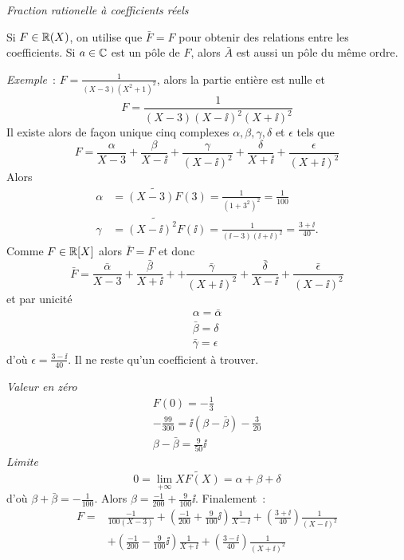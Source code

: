 \emph{Fraction rationelle à coefficients réels}

Si $F \in \mathbb{R}(X)$, on utilise que $\bar{F}=F$ pour obtenir des relations entre les coefficients. Si $a \in \mathbb{C}$ est un pôle de $F$, alors $\bar{A}$ est aussi un pôle du même ordre.

\emph{Exemple}~: $F=\frac{1}{(X-3)(X^2+1)^2}$, alors la partie entière est nulle et
\begin{equation}
  F = \frac{1}{(X-3)(X-\ii)^2(X+\ii)^2}
\end{equation}
Il existe alors de façon unique cinq complexes $\alpha,\beta,\gamma,\delta$ et $\epsilon$ tels que
\begin{equation}
  F = \frac{\alpha}{X-3} + \frac{\beta}{X-\ii} +\frac{\gamma}{(X-\ii)^2} +\frac{\delta}{X+\ii} +\frac{\epsilon}{(X+\ii)^2}
\end{equation}
Alors
\begin{align}
  \alpha &= \widetilde{(X-3)F}(3)=\frac{1}{(1+3^2)^2}=\frac{1}{100} \\
  \gamma &= \widetilde{(X-\ii)^2F}(\ii) = \frac{1}{(\ii-3)(\ii+\ii)^2}=\frac{3+\ii}{40}.
\end{align}
Comme $F \in \mathbb{R}[X]$ alors $\bar{F}=F$ et donc
\begin{equation}
  \bar{F} = \frac{\bar{\alpha}}{X-3} + \frac{\bar{\beta}}{X+\ii} + +\frac{\bar{\gamma}}{(X+\ii)^2} +\frac{\bar{\delta}}{X-\ii} +\frac{\bar{\epsilon}}{(X-\ii)^2}
\end{equation}
et par unicité
\begin{align}
  \alpha=\bar{\alpha}\\
  \bar{\beta}=\delta\\
  \bar{\gamma}=\epsilon
\end{align}
d'où $\epsilon = \frac{3-\ii}{40}$. Il ne reste qu'un coefficient à trouver.

\emph{Valeur en zéro}
\begin{align}
  F(0)=-\frac{1}{3}\\
  -\frac{99}{300} = \ii(\beta-\bar{\beta})-\frac{3}{20}\\
  \beta-\bar{\beta}=\frac{9}{50}\ii
\end{align}
\emph{Limite}
\begin{equation}
  0 = \lim\limits_{+\infty}\widetilde{XF(X)}=\alpha+\beta+\delta
\end{equation}
d'où $\beta+\bar{\beta}=-\frac{1}{100}$. Alors $\beta = \frac{-1}{200}+\frac{9}{100}\ii$. Finalement~:
\begin{align}
  F = &\frac{-1}{100(X-3)} + \left(\frac{-1}{200}+\frac{9}{100}\ii\right) \frac{1}{X-\ii} + \left(\frac{3+\ii}{40}\right)\frac{1}{(X-\ii)^2} \\ & + \left(\frac{-1}{200}-\frac{9}{100}\ii\right)\frac{1}{X+\ii} + \left(\frac{3-\ii}{40}\right)\frac{1}{(X+\ii)^2}
\end{align}

